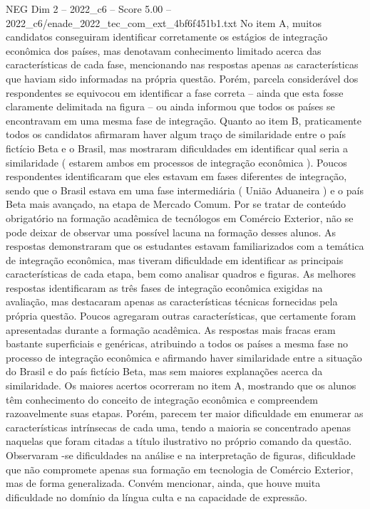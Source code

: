 \begin{textsample}{NEG Dim 2 – 2022\_c6 – Score 5.00 – 2022\_c6/enade\_2022\_tec\_com\_ext\_4bf6f451b1.txt}
No item A, muitos candidatos conseguiram identificar corretamente os estágios de integração econômica dos países, mas denotavam conhecimento limitado acerca das características de cada fase, mencionando nas respostas apenas as características que haviam sido informadas na própria questão.
Porém, parcela considerável dos respondentes se equivocou em identificar a fase correta – ainda que esta fosse claramente delimitada na figura – ou ainda informou que todos os países se encontravam em uma mesma fase de integração.
Quanto ao item B, praticamente todos os candidatos afirmaram haver algum traço de similaridade entre o país fictício Beta e o Brasil, mas mostraram dificuldades em identificar qual seria a similaridade ( estarem ambos em processos de integração econômica ).
Poucos respondentes identificaram que eles estavam em fases diferentes de integração, sendo que o Brasil estava em uma fase intermediária ( União Aduaneira ) e o país Beta mais avançado, na etapa de Mercado Comum.
Por se tratar de conteúdo obrigatório na formação acadêmica de tecnólogos em Comércio Exterior, não se pode deixar de observar uma possível lacuna na formação desses alunos.
As respostas demonstraram que os estudantes estavam familiarizados com a temática de integração econômica, mas tiveram dificuldade em identificar as principais características de cada etapa, bem como analisar quadros e figuras.
As melhores respostas identificaram as três fases de integração econômica exigidas na avaliação, mas destacaram apenas as características técnicas fornecidas pela própria questão.
Poucos agregaram outras características, que certamente foram apresentadas durante a formação acadêmica.
As respostas mais fracas eram bastante superficiais e genéricas, atribuindo a todos os países a mesma fase no processo de integração econômica e afirmando haver similaridade entre a situação do Brasil e do país fictício Beta, mas sem maiores explanações acerca da similaridade.
Os maiores acertos ocorreram no item A, mostrando que os alunos têm conhecimento do conceito de integração econômica e compreendem razoavelmente suas etapas.
Porém, parecem ter maior dificuldade em enumerar as características intrínsecas de cada uma, tendo a maioria se concentrado apenas naquelas que foram citadas a título ilustrativo no próprio comando da questão.
Observaram -se dificuldades na análise e na interpretação de figuras, dificuldade que não compromete apenas sua formação em tecnologia de Comércio Exterior, mas de forma generalizada.
Convém mencionar, ainda, que houve muita dificuldade no domínio da língua culta e na capacidade de expressão.

\end{textsample}
